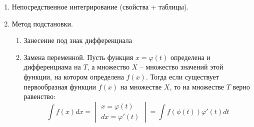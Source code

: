 \begin{enumerate}
    \item Непосредственное интегрирование (свойства + таблицы).
    \item Метод подстановки.
    \begin{enumerate}
        \item Занесение под знак дифференциала
        \item Замена переменной.
            Пусть функция $x = \varphi(t)$ определена и дифференциама на $T$,  а множество $X$ -- множество значений этой функции, на котором определена $f(x)$. Тогда если существует первообразная функции $f(x)$ на множестве $X$, то на множестве $T$ верно равенство: \[
                \int f(x) dx = \begin{vmatrix}
                    x = \varphi(t) \\
                    dx = \varphi'(t)
                \end{vmatrix} = \int f(\phi(t)) \varphi'(t) dt
            \]
    \end{enumerate}
\end{enumerate}
